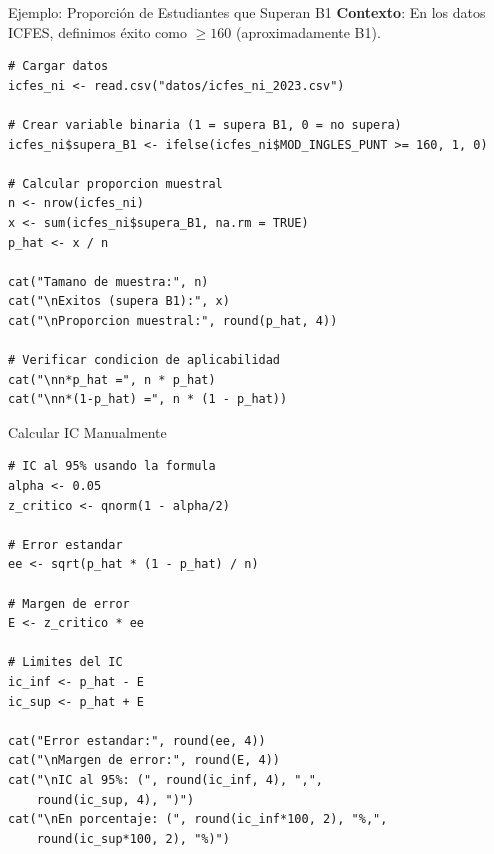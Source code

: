 \documentclass[aspectratio=169, 11pt]{beamer}
\begin{document}
\begin{frame}[fragile]{Ejemplo: Proporción de Estudiantes que Superan B1}
\small
\textbf{Contexto}: En los datos ICFES, definimos éxito como  $\geq 160$ (aproximadamente B1).

\begin{lstlisting}[basicstyle=\ttfamily\scriptsize]
# Cargar datos
icfes_ni <- read.csv("datos/icfes_ni_2023.csv")

# Crear variable binaria (1 = supera B1, 0 = no supera)
icfes_ni$supera_B1 <- ifelse(icfes_ni$MOD_INGLES_PUNT >= 160, 1, 0)

# Calcular proporcion muestral
n <- nrow(icfes_ni)
x <- sum(icfes_ni$supera_B1, na.rm = TRUE)
p_hat <- x / n

cat("Tamano de muestra:", n)
cat("\nExitos (supera B1):", x)
cat("\nProporcion muestral:", round(p_hat, 4))

# Verificar condicion de aplicabilidad
cat("\nn*p_hat =", n * p_hat)
cat("\nn*(1-p_hat) =", n * (1 - p_hat))
\end{lstlisting}
\end{frame}

\begin{frame}[fragile]{Calcular IC Manualmente}
\begin{lstlisting}[basicstyle=\ttfamily\scriptsize]
# IC al 95% usando la formula
alpha <- 0.05
z_critico <- qnorm(1 - alpha/2)

# Error estandar
ee <- sqrt(p_hat * (1 - p_hat) / n)

# Margen de error
E <- z_critico * ee

# Limites del IC
ic_inf <- p_hat - E
ic_sup <- p_hat + E

cat("Error estandar:", round(ee, 4))
cat("\nMargen de error:", round(E, 4))
cat("\nIC al 95%: (", round(ic_inf, 4), ",",
    round(ic_sup, 4), ")")
cat("\nEn porcentaje: (", round(ic_inf*100, 2), "%,",
    round(ic_sup*100, 2), "%)")
\end{lstlisting}
\end{frame}
\end{document}
